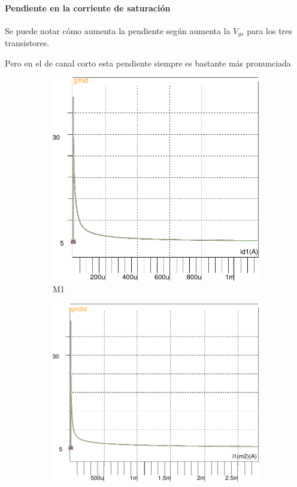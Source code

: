 \paragraph{Pendiente en la corriente de saturación}
Se puede notar cómo aumenta la pendiente según aumenta la $V_{gs}$ para los tres transistores.

Pero en el de canal corto esta pendiente siempre es bastante más pronunciada

\begin{figure}[!tbp]
   \begin{subfigure}[b]{0.3\textwidth}
       \includegraphics[width=\textwidth]{images/gmid_id_m1}
   \caption{M1}
   \label{fig:f1}
   \end{subfigure}
   \begin{subfigure}[b]{0.34\textwidth}
   \includegraphics[width=\textwidth]{images/gmid_id_m2}

\end{subfigure}
\end{figure}
